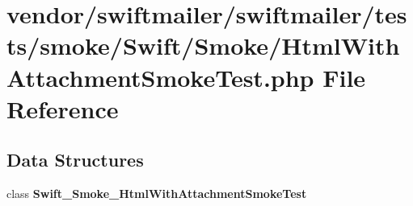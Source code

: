 \section{vendor/swiftmailer/swiftmailer/tests/smoke/\+Swift/\+Smoke/\+Html\+With\+Attachment\+Smoke\+Test.php File Reference}
\label{_html_with_attachment_smoke_test_8php}
\subsection*{Data Structures}
\begin{DoxyCompactItemize}
\item 
class {\bf Swift\+\_\+\+Smoke\+\_\+\+Html\+With\+Attachment\+Smoke\+Test}
\end{DoxyCompactItemize}
